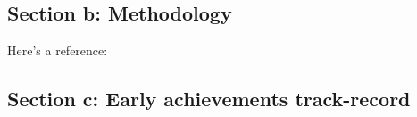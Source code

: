 \documentclass{article}
\begin{document}
\begin{b2}
\part{Section b: Methodology}

Here's a reference: \cite{texbook}
\end{b2}





\newpage


\newpage



\begin{b1}


\part{Section c:  Early achievements track-record}


\end{b1}
\end{document}
